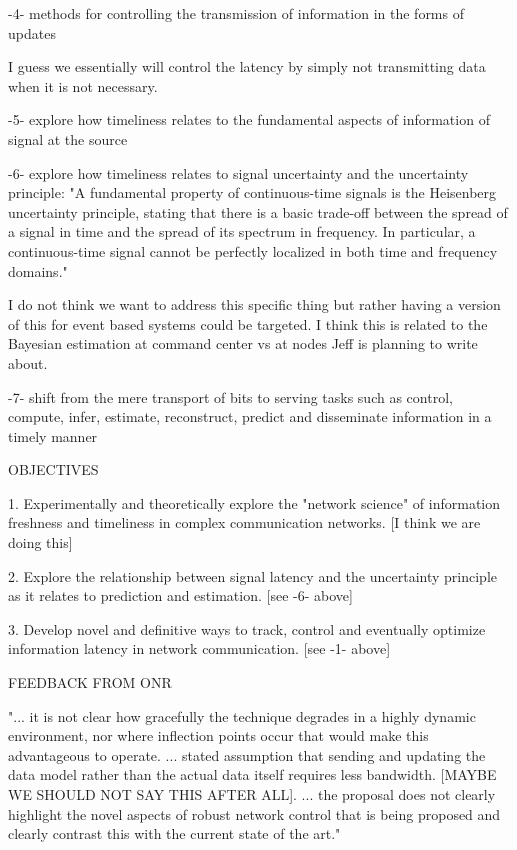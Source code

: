 \documentclass[12pt,letterpaper]{article}
\begin{document}
-4- methods for controlling the transmission of information in the forms of updates

I guess we essentially will control the latency by simply not transmitting data when it is not necessary.
\\ \quad

-5- explore how timeliness relates to the fundamental aspects of information of signal at the source
\\ \quad

-6- explore how timeliness relates to signal uncertainty and the uncertainty principle: "A fundamental property of continuous-time signals is the Heisenberg uncertainty principle, stating that there is a basic trade-off between the spread of a signal in time and the spread of its spectrum in frequency. In particular, a continuous-time signal cannot be perfectly localized
in both time and frequency domains."  

I do not think we want to address this specific thing but rather having a version of this for event based systems could be targeted. I think this is related to the Bayesian estimation at command center vs at nodes Jeff is planning to write about. 
\\ \quad

-7- shift from the mere transport of bits to serving tasks such as control, compute, infer, estimate, reconstruct, predict and disseminate information in a timely manner
\\ \quad

OBJECTIVES
\\ \quad

1. Experimentally and theoretically explore the "network science" of information freshness and timeliness in complex communication networks. [I think we are doing this]
\\ \quad

2. Explore the relationship between signal latency and the uncertainty principle as it relates to prediction and estimation. [see -6- above]
\\ \quad

3. Develop novel and definitive ways to track, control and eventually optimize information latency in network communication. [see -1- above]
\\ \quad


FEEDBACK FROM ONR
\\ \quad

"... it is not clear how gracefully the technique degrades in a highly dynamic environment, nor where inflection points occur that would make this advantageous to operate.  ... stated assumption that sending and updating the data model rather than the actual data itself requires less bandwidth. [MAYBE WE SHOULD NOT SAY THIS AFTER ALL]. ... the proposal does not clearly highlight the novel aspects of robust network control that is being proposed and clearly contrast this with the current state of the art."
\\ \quad
\end{document}
